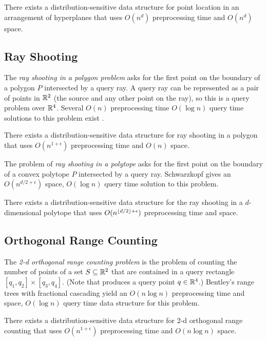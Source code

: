 \documentclass{patmorin}
\begin{document}
\begin{thm}
  There exists a distribution-sensitive data structure for point location
  in an arrangement of hyperplanes that uses $O(n^d)$ preprocessing time
  and $O(n^d)$ space.
\end{thm}

\subsection{Ray Shooting}

The \emph{ray shooting in a polygon problem} asks for the first point
on the boundary of a polygon $P$ intersected by a query ray.  A query
ray can be represented as a pair of points in $\mathbb{R}^2$ (the source and
any other point on the ray), so this is a query problem over $\mathbb{R}^4$.
Several $O(n)$ preprocessing time $O(\log n)$ query time solutions to
this problem exist \cite{cegghss94,hs95}.

\begin{thm}
  There exists a distribution-sensitive data structure for ray shooting
  in a polygon that uses $O(n^{1+\epsilon})$ preprocessing time and
  $O(n)$ space.
\end{thm}

The problem of \emph{ray shooting in a polytope} asks for the first point
on the boundary of a convex polytope $P$ intersected by a query ray.
Schwarzkopf gives an $O(n^{{d/2}+\epsilon})$ space, $O(\log n)$ query
time solution to this problem.

\begin{thm}
  There exists a distribution-sensitive data structure for
  the ray shooting in a $d$-dimensional polytope that uses
  $O(n^{{\left\lfloor d/2 \right\rfloor}+\epsilon})$ preprocessing time and space.
\end{thm}

\subsection{Orthogonal Range Counting}

The \emph{2-d orthogonal range counting problem} is the problem
of counting the number of points of a set $S\subseteq\mathbb{R}^2$ that are
contained in a query rectangle $[q_1,q_2]\times[q_3,q_4]$. (Note that
produces a query point $q\in \mathbb{R}^4$.) Bentley's range trees \cite{b75} with
fractional cascading \cite{cg86,l78} yield an $O(n\log n)$ preprocessing
time and space, $O(\log n)$ query time data structure for this problem.

\begin{thm}
  There exists a distribution-sensitive data structure for 2-d orthogonal
  range counting that uses $O(n^{1+\epsilon})$ preprocessing time and
  $O(n\log n)$ space.
\end{thm}
\end{document}
